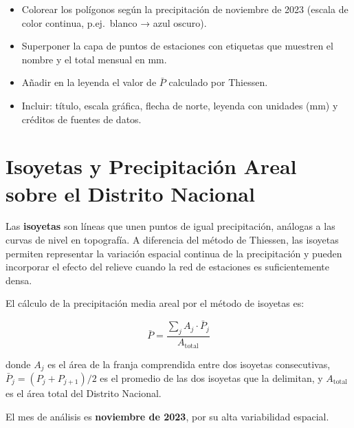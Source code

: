 \documentclass[11pt]{article}
\begin{document}

\begin{itemize}
  \item Colorear los polígonos según la precipitación de noviembre de 2023
    (escala de color continua, p.ej.\ blanco → azul oscuro).
  \item Superponer la capa de puntos de estaciones con etiquetas que muestren
    el nombre y el total mensual en mm.
  \item Añadir en la leyenda el valor de $\bar{P}$ calculado por Thiessen.
  \item Incluir: título, escala gráfica, flecha de norte, leyenda con unidades (mm)
    y créditos de fuentes de datos.
\end{itemize}

\section{Isoyetas y Precipitación Areal sobre el Distrito Nacional}

Las \textbf{isoyetas} son líneas que unen puntos de igual precipitación,
análogas a las curvas de nivel en topografía.
A diferencia del método de Thiessen, las isoyetas permiten representar la
variación espacial continua de la precipitación y pueden incorporar el efecto
del relieve cuando la red de estaciones es suficientemente densa.

El cálculo de la precipitación media areal por el método de isoyetas es:

\begin{equation}
  \bar{P} = \frac{\sum\limits_{j} A_j \cdot \bar{P}_j}{A_{\text{total}}}
  \label{eq:isoyetas}
\end{equation}

donde $A_j$ es el área de la franja comprendida entre dos isoyetas consecutivas,
$\bar{P}_j = (P_j + P_{j+1})/2$ es el promedio de las dos isoyetas que la delimitan,
y $A_{\text{total}}$ es el área total del Distrito Nacional.


El mes de análisis es \textbf{noviembre de 2023}, por su alta variabilidad espacial.
\end{document}
